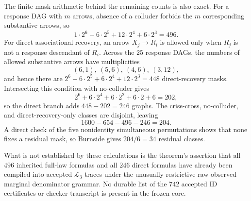 The finite mask arithmetic behind the remaining counts is also exact.  For a response DAG with \(m\) arrows, absence of a colluder forbids the \(m\) corresponding substantive arrows, so
\[
1\cdot2^6+6\cdot2^5+12\cdot2^4+6\cdot2^3=496.
\]
For direct associational recovery, an arrow \(X_j\to R_i\) is allowed only when \(R_j\) is not a response descendant of \(R_i\).  Across the \(25\) response DAGs, the numbers of allowed substantive arrows have multiplicities
\[
(6,1),\ (5,6),\ (4,6),\ (3,12),
\]
and hence there are \(2^6+6\cdot2^5+6\cdot2^4+12\cdot2^3=448\) direct-recovery masks.  Intersecting this condition with no-colluder gives
\[
2^6+6\cdot2^4+6\cdot2^2+6\cdot2+6=202,
\]
so the direct branch adds \(448-202=246\) graphs.  The criss-cross, no-colluder, and direct-recovery-only classes are disjoint, leaving
\[
1600-654-496-246=204.
\]
A direct check of the five nonidentity simultaneous permutations shows that none fixes a residual mask, so Burnside gives \(204/6=34\) residual classes.

What is not established by these calculations is the theorem's assertion that all \(496\) inherited full-law formulas and all \(246\) direct formulas have already been compiled into accepted \(\mathcal L_3\) traces under the unusually restrictive raw-observed-marginal denominator grammar.  No durable list of the \(742\) accepted \(\mathrm{ID}\) certificates or checker transcript is present in the frozen core.